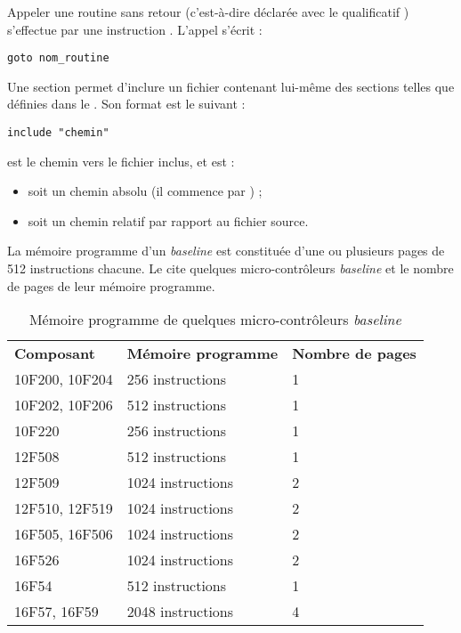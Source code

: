 Appeler une routine sans retour (c'est-à-dire déclarée avec le qualificatif ) s'effectue par une instruction . L'appel s'écrit :
\begin{lstlisting}[language=piccolo]
goto nom_routine
\end{lstlisting}





Une section  permet d'inclure un fichier contenant lui-même des sections telles que définies dans le .  Son format est le suivant :

\begin{lstlisting}[language=piccolo]
  include "chemin"
\end{lstlisting}

 est le chemin vers le fichier inclus, et est :
\begin{itemize}
  \item soit un chemin absolu (il commence par \piccolo{/}) ;
  \item soit un chemin relatif par rapport au fichier source.
\end{itemize}


La mémoire programme d'un \emph{baseline} est constituée d'une ou plusieurs pages de 512 instructions chacune. Le  cite quelques micro-contrôleurs \emph{baseline} et le nombre de pages de leur mémoire programme.

\begin{table}[!t]
  \centering
  \small
  \begin{tabular}{lll}
    \textbf{Composant} & \textbf{Mémoire programme} & \textbf{Nombre de pages}\\
    10F200, 10F204  & 256 instructions & 1\\
    \hdashline
    10F202, 10F206  & 512 instructions & 1\\
    \hdashline
    10F220  & 256 instructions & 1\\
    \hdashline
    12F508  & 512 instructions & 1\\
    \hdashline
    12F509  & 1024 instructions & 2\\
    \hdashline
    12F510, 12F519  & 1024 instructions & 2\\
    \hdashline
    16F505, 16F506  & 1024 instructions & 2\\
    \hdashline
    16F526 & 1024 instructions & 2\\
    \hdashline
    16F54  & 512 instructions & 1\\
    \hdashline
    16F57, 16F59  & 2048 instructions & 4\\
  \end{tabular}
  \caption{Mémoire programme de quelques micro-contrôleurs \emph{baseline}}
  \ligne
\end{table}

